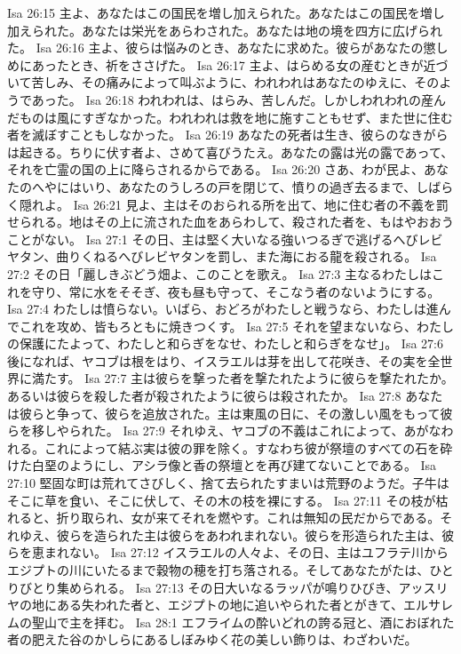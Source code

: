 Isa 26:15  主よ、あなたはこの国民を増し加えられた。あなたはこの国民を増し加えられた。あなたは栄光をあらわされた。あなたは地の境を四方に広げられた。
Isa 26:16  主よ、彼らは悩みのとき、あなたに求めた。彼らがあなたの懲しめにあったとき、祈をささげた。
Isa 26:17  主よ、はらめる女の産むときが近づいて苦しみ、その痛みによって叫ぶように、われわれはあなたのゆえに、そのようであった。
Isa 26:18  われわれは、はらみ、苦しんだ。しかしわれわれの産んだものは風にすぎなかった。われわれは救を地に施すこともせず、また世に住む者を滅ぼすこともしなかった。
Isa 26:19  あなたの死者は生き、彼らのなきがらは起きる。ちりに伏す者よ、さめて喜びうたえ。あなたの露は光の露であって、それを亡霊の国の上に降らされるからである。
Isa 26:20  さあ、わが民よ、あなたのへやにはいり、あなたのうしろの戸を閉じて、憤りの過ぎ去るまで、しばらく隠れよ。
Isa 26:21  見よ、主はそのおられる所を出て、地に住む者の不義を罰せられる。地はその上に流された血をあらわして、殺された者を、もはやおおうことがない。
Isa 27:1  その日、主は堅く大いなる強いつるぎで逃げるへびレビヤタン、曲りくねるへびレビヤタンを罰し、また海におる龍を殺される。
Isa 27:2  その日「麗しきぶどう畑よ、このことを歌え。
Isa 27:3  主なるわたしはこれを守り、常に水をそそぎ、夜も昼も守って、そこなう者のないようにする。
Isa 27:4  わたしは憤らない。いばら、おどろがわたしと戦うなら、わたしは進んでこれを攻め、皆もろともに焼きつくす。
Isa 27:5  それを望まないなら、わたしの保護にたよって、わたしと和らぎをなせ、わたしと和らぎをなせ」。
Isa 27:6  後になれば、ヤコブは根をはり、イスラエルは芽を出して花咲き、その実を全世界に満たす。
Isa 27:7  主は彼らを撃った者を撃たれたように彼らを撃たれたか。あるいは彼らを殺した者が殺されたように彼らは殺されたか。
Isa 27:8  あなたは彼らと争って、彼らを追放された。主は東風の日に、その激しい風をもって彼らを移しやられた。
Isa 27:9  それゆえ、ヤコブの不義はこれによって、あがなわれる。これによって結ぶ実は彼の罪を除く。すなわち彼が祭壇のすべての石を砕けた白堊のようにし、アシラ像と香の祭壇とを再び建てないことである。
Isa 27:10  堅固な町は荒れてさびしく、捨て去られたすまいは荒野のようだ。子牛はそこに草を食い、そこに伏して、その木の枝を裸にする。
Isa 27:11  その枝が枯れると、折り取られ、女が来てそれを燃やす。これは無知の民だからである。それゆえ、彼らを造られた主は彼らをあわれまれない。彼らを形造られた主は、彼らを恵まれない。
Isa 27:12  イスラエルの人々よ、その日、主はユフラテ川からエジプトの川にいたるまで穀物の穂を打ち落される。そしてあなたがたは、ひとりびとり集められる。
Isa 27:13  その日大いなるラッパが鳴りひびき、アッスリヤの地にある失われた者と、エジプトの地に追いやられた者とがきて、エルサレムの聖山で主を拝む。
Isa 28:1  エフライムの酔いどれの誇る冠と、酒におぼれた者の肥えた谷のかしらにあるしぼみゆく花の美しい飾りは、わざわいだ。
